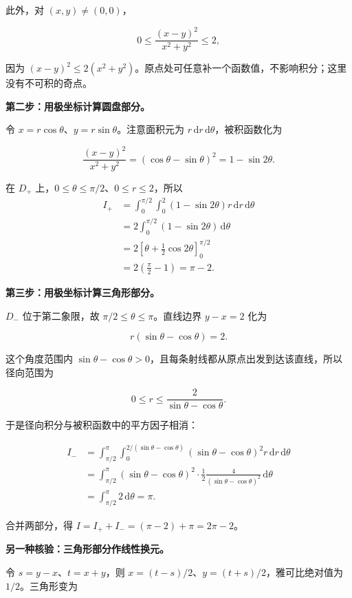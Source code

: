 \documentclass[UTF8,11pt,fontset=windows]{ctexart}
\begin{document}
此外，对 $(x,y)\ne(0,0)$，

$$
0\le\frac{(x-y)^2}{x^2+y^2}\le2,
$$

因为 $(x-y)^2\le2(x^2+y^2)$。原点处可任意补一个函数值，不影响积分；这里没有不可积的奇点。

\textbf{第二步：用极坐标计算圆盘部分。}

令 $x=r\cos\theta$、$y=r\sin\theta$。注意面积元为 $r\,\mathrm dr\,\mathrm d\theta$，被积函数化为

$$
\frac{(x-y)^2}{x^2+y^2}
=(\cos\theta-\sin\theta)^2=1-\sin2\theta.
$$

在 $D_+$ 上，$0\le\theta\le\pi/2$、$0\le r\le2$，所以
$$
\begin{aligned}
I_+
&=\int_0^{\pi/2}\int_0^2(1-\sin2\theta)r\,\mathrm dr\,\mathrm d\theta\\
&=2\int_0^{\pi/2}(1-\sin2\theta)\,\mathrm d\theta\\
&=2\left[\theta+\frac12\cos2\theta\right]_0^{\pi/2}\\
&=2\left(\frac\pi2-1\right)=\pi-2.
\end{aligned}
$$

\textbf{第三步：用极坐标计算三角形部分。}

$D_-$ 位于第二象限，故 $\pi/2\le\theta\le\pi$。直线边界 $y-x=2$ 化为

$$
r(\sin\theta-\cos\theta)=2.
$$

这个角度范围内 $\sin\theta-\cos\theta>0$，且每条射线都从原点出发到达该直线，所以径向范围为

$$
0\le r\le\frac2{\sin\theta-\cos\theta}.
$$

于是径向积分与被积函数中的平方因子相消：

$$
\begin{aligned}
I_-
&=\int_{\pi/2}^{\pi}\int_0^{2/(\sin\theta-\cos\theta)}
(\sin\theta-\cos\theta)^2r\,\mathrm dr\,\mathrm d\theta\\
&=\int_{\pi/2}^{\pi}(\sin\theta-\cos\theta)^2
\cdot\frac12\frac4{(\sin\theta-\cos\theta)^2}\,\mathrm d\theta\\
&=\int_{\pi/2}^{\pi}2\,\mathrm d\theta=\pi.
\end{aligned}
$$

合并两部分，得 $\boxed{I=I_++I_-=(\pi-2)+\pi=2\pi-2}$。

\textbf{另一种核验：三角形部分作线性换元。}

令 $s=y-x$、$t=x+y$，则 $x=(t-s)/2$、$y=(t+s)/2$，雅可比绝对值为 $1/2$。三角形变为
\end{document}
